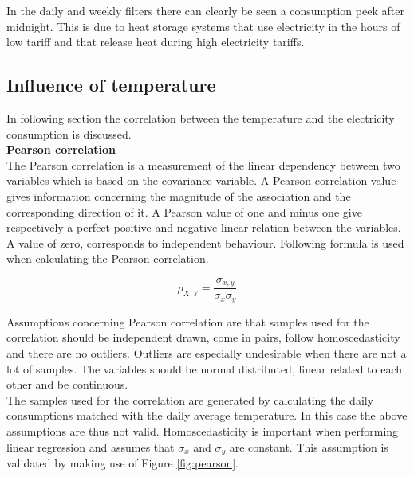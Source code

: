 

In the daily and weekly filters there can clearly be seen a consumption peek after midnight. This is due to heat storage systems that use electricity in the hours of low tariff and that release heat during high electricity tariffs. 


\subsection{Influence of temperature}
In following section the correlation between the temperature and the electricity consumption is discussed.\\


\textbf{Pearson correlation}\\
The Pearson correlation is a measurement of the linear dependency between two variables which is based on the covariance variable. A Pearson correlation value gives information concerning the magnitude of the association and the corresponding direction of it. A Pearson value of one and minus one give respectively a perfect positive and negative linear relation between the variables. A value of zero, corresponds to independent behaviour. Following formula is used when calculating the Pearson correlation. 

\begin{equation}\label{eq:pearson}
	\rho_{X,Y} = \frac{\sigma_{x,y}}{\sigma_x\sigma_y}
\end{equation}

Assumptions concerning Pearson correlation are that samples used for the correlation should be independent drawn, come in pairs, follow homoscedasticity and there are no outliers. Outliers are especially undesirable when there are not a lot of samples. The variables should be normal distributed, linear related to each other and be continuous.\\
The samples used for the correlation are generated by calculating the daily consumptions matched with the daily average temperature. In this case the above assumptions are thus not valid. Homoscedasticity is important when performing linear regression and assumes that $ \sigma_x $ and $ \sigma_y $ are constant. This assumption is validated by making use of Figure \ref{fig:pearson}.

